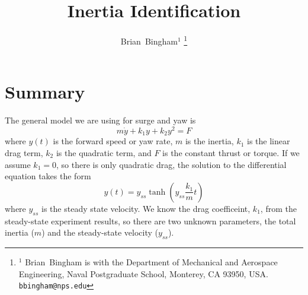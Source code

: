\documentclass[11pt,draftcls,journal,onecolumn]{../latexlib/latex_ieee/IEEEtran}
\begin{document}
\newtheorem{remark}{Remark}
\renewcommand{\theremark}{\unskip}



%


\newcommand{\SF}{0.2}
\newcommand{\SFb}{0.45}
\newcommand{\SFPic}{0.45}
\newcommand{\SFPlot}{0.45}
\newcommand{\SFc}{0.25}
\newcommand{\FigWidth}{\SFb}

\newcommand{\scaleOneTwo}[2] {\scalebox{#1}}

\graphicspath{{images/}}

\title{Inertia Identification}

\author{Brian~Bingham$^{1}$%
\thanks{$^{1}$ Brian~Bingham is with the Department of Mechanical and Aerospace Engineering, Naval Postgraduate School, Monterey, CA 93950, USA. {\tt\small bbingham@nps.edu}}%
}

\maketitle


\IEEEpeerreviewmaketitle

\section{Summary}
The general model we are using for surge and yaw is 
\[
m\dot{y}+k_1 y + k_2 y^2 = F
\]
where $y(t)$ is the forward speed or yaw rate, $m$ is the inertia, $k_1$ is the linear drag term, $k_2$ is the quadratic term, and $F$ is the constant thrust or torque.  If we assume $k_1 = 0$, so there is only quadratic drag, the solution to the differential equation takes the form
\[
y(t) = y_{ss} \tanh\left(y_{ss} \frac{k_1}{m} t \right)
\]
where $y_{ss}$ is the steady state velocity.  We know the drag coefficeint, $k_1$, from the steady-state experiment results, so there are two unknown parameters, the total inertia ($m$) and the steady-state velocity ($y_{ss}$).  
\end{document}
